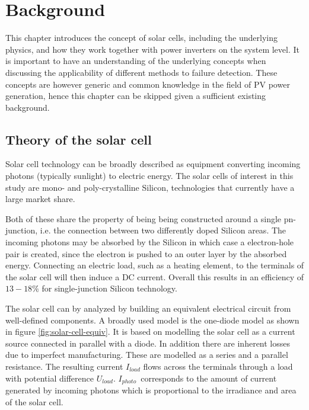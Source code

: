 \chapter{Background}
This chapter introduces the concept of solar cells, including the underlying physics,
and how they work together with power inverters on the system level.
It is important to have an understanding of the underlying concepts when discussing the applicability of different methods to failure detection.
These concepts are however generic and common knowledge in the field of PV power generation, 
hence this chapter can be skipped given a sufficient existing background.

\section{Theory of the solar cell}
Solar cell technology can be broadly described as equipment converting incoming photons (typically sunlight) to electric energy.
The solar cells of interest in this study are mono- and poly-crystalline Silicon, technologies that currently have a large market share\cite{Zhao2010thesis}.

Both of these share the property of being being constructed around a single pn-junction, i.e. the connection between two differently doped Silicon areas.
The incoming photons may be absorbed by the Silicon in which case a electron-hole pair is created\cite{Zhao2010thesis}, since the electron is pushed to an outer layer by the absorbed energy.
Connecting an electric load, such as a heating element, to the terminals of the solar cell will then induce a DC current.
Overall this results in an efficiency of $13-18\%$ for single-junction Silicon technology\cite{Zhao2010thesis}.

The solar cell can by analyzed by building an equivalent electrical circuit from well-defined components.
A broadly used model is the one-diode model\cite{Walker2001} as shown in figure \ref{fig:solar-cell-equiv}.
It is based on modelling the solar cell as a current source connected in parallel with a diode.
In addition there are inherent losses due to imperfect manufacturing.
These are modelled as a series and a parallel resistance.
The resulting current $I_{load}$ flows across the terminals through a load with potential difference $U_{load}$.
$I_{photo}$ corresponds to the amount of current generated by incoming photons which is proportional to the irradiance and area of the solar cell.


